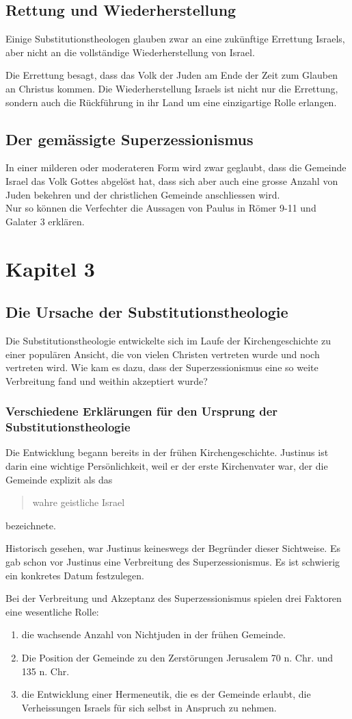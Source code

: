 \documentclass{../../inc/mybib}
\newcommand{\st}{Substitutionstheolog}
\newcommand{\sz}{Superzessionismus}
\begin{document}
    \subsection{Rettung und Wiederherstellung}
    Einige \st en glauben zwar an eine zukünftige Errettung Israels, aber nicht an die vollständige Wiederherstellung von Israel.

    Die Errettung besagt, dass das Volk der Juden am Ende der Zeit zum Glauben an Christus kommen.
    Die Wiederherstellung Israels ist nicht nur die Errettung, sondern auch die Rückführung in ihr Land um eine einzigartige Rolle erlangen.
    \subsection{Der gemässigte \sz}
    In einer milderen oder moderateren Form wird zwar geglaubt, dass die Gemeinde Israel das Volk Gottes abgelöst hat, dass sich aber auch eine grosse Anzahl von Juden bekehren und der christlichen Gemeinde anschliessen wird.\\
    Nur so können die Verfechter die Aussagen von Paulus in Römer 9-11 und Galater 3 erklären.
    \section{Kapitel 3}
    \subsection{Die Ursache der \st ie}
    Die \st ie entwickelte sich im Laufe der Kirchengeschichte zu einer populären Ansicht, die von vielen Christen vertreten wurde und noch vertreten wird. Wie kam es dazu, dass der \sz{} eine so weite Verbreitung fand und weithin akzeptiert wurde?
    \subsubsection{Verschiedene Erklärungen für den Ursprung der \st ie}
    Die Entwicklung begann bereits in der frühen Kirchengeschichte. Justinus ist darin eine wichtige Persönlichkeit, weil er der erste Kirchenvater war, der die Gemeinde explizit als das \blockquote{wahre geistliche Israel} bezeichnete.

    Historisch gesehen, war Justinus keineswegs der Begründer dieser Sichtweise. Es gab schon vor Justinus eine Verbreitung des \sz. Es ist schwierig ein konkretes Datum festzulegen.

    Bei der Verbreitung und Akzeptanz des \sz{} spielen drei Faktoren eine wesentliche Rolle:
    \begin{enumerate}
        \item die wachsende Anzahl von Nichtjuden in der frühen Gemeinde.
        \item Die Position der Gemeinde zu den Zerstörungen Jerusalem 70 n. Chr. und 135 n. Chr.
        \item die Entwicklung einer Hermeneutik, die es der Gemeinde erlaubt, die Verheissungen Israels für sich selbst in Anspruch zu nehmen.
    \end{enumerate}
\end{document}
